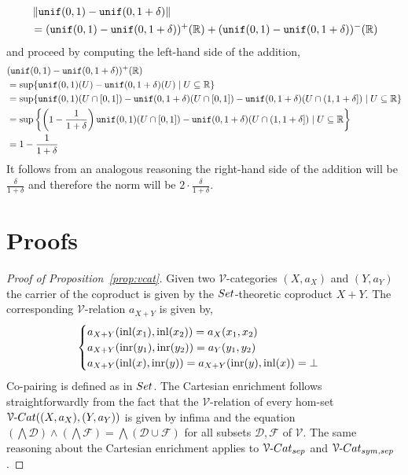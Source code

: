 \documentclass[a4paper,UKenglish,cleveref, autoref, thm-restate]{lipics-v2021}
\begin{document}
\begin{align*}
        & \left\lVert  \mathtt{unif}(0,1) - \mathtt{unif}(0,1+\delta)  \right\rVert
        \\
        & =
        (\mathtt{unif}(0,1) - \mathtt{unif}(0,1+\delta))^+ (\mathbb{R})
        +
        (\mathtt{unif}(0,1) - \mathtt{unif}(0,1+\delta))^- (\mathbb{R})
        \end{align*}
        and proceed by computing the left-hand side of the addition,
        \begin{align*} 
        & (\mathtt{unif}(0,1) - \mathtt{unif}(0,1+\delta))^+ (\mathbb{R})
        \\
        &  = 
        \sup \{ \mathtt{unif}(0,1)(U) - \mathtt{unif}(0,1 + \delta)(U)
        \mid U \subseteq \mathbb{R} \}
        \\
        & 
        =
        \sup \{ \mathtt{unif}(0,1)(U \cap [0,1]) 
        - \mathtt{unif}(0,1 + \delta)(U \cap [0,1]) 
        - \mathtt{unif}(0,1 + \delta)(U \cap (1,1 + \delta]) 
        \mid U \subseteq \mathbb{R} \}
        \\
        &
        = \sup \left \{ \left (1 - \frac{1}{1+\delta} \right ) 
                \mathtt{unif}(0,1)(U \cap [0,1]) 
        - \mathtt{unif}(0,1 + \delta)(U \cap (1,1 + \delta]) 
        \mid U \subseteq \mathbb{R} \right \}
        \\
        & = 1 - \frac{1}{1+\delta} 
        \end{align*}
        It follows from an analogous reasoning the right-hand side of the
        addition will be $\frac{\delta}{1 + \delta}$ and therefore the norm
        will be $2 \cdot {\frac{\delta}{1 + \delta}}$.
\section{Proofs}
\label{sec:proof}
\begin{proof}[Proof of Proposition~\ref{prop:vcat}]
        Given two $\mathcal{V}$-categories $(X,a_X)$ and $(Y,a_Y)$ the carrier
        of the coproduct is given by the $\catfont{Set}$-theoretic coproduct $X
        + Y$. The corresponding $\mathcal{V}$-relation $a_{X + Y}$ is given
        by,
        \[
                \begin{cases}
                        a_{X + Y}(\mathrm{inl}(x_1),\mathrm{inl}(x_2)) = a_X(x_1,x_2) \\
                        a_{X + Y}(\mathrm{inr}(y_1),\mathrm{inr}(y_2)) = a_Y(y_1,y_2) \\
                        a_{X + Y}(\mathrm{inl}(x), \mathrm{inr}(y)) = 
                        a_{X + Y}(\mathrm{inr}(y), \mathrm{inl}(x))  = \bot
                \end{cases}
        \]
        Co-pairing is defined as in $\catfont{Set}$. The Cartesian
        enrichment follows straightforwardly from the fact that the
        $\mathcal{V}$-relation of every hom-set $\VCat((X,a_X),(Y,a_Y))$ is
        given by infima and the equation $(\bigwedge \mathscr{D}) \wedge
        (\bigwedge \mathscr{F}) = \bigwedge (\mathscr{D} \cup \mathscr{F})$ for
        all subsets $\mathscr{D},\mathscr{F}$ of $\mathcal{V}$.  The same
        reasoning about the Cartesian enrichment applies to $\VCatSe$ and
        $\VCatSS$.
\end{proof}
\end{document}
